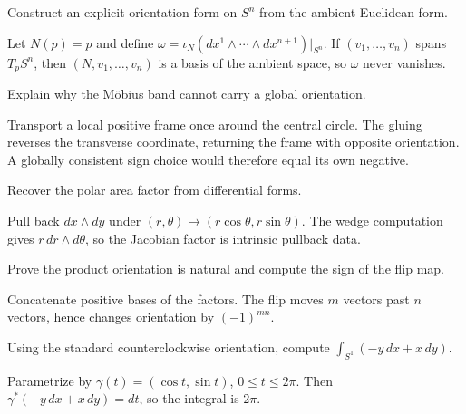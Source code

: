 \begin{problem}\label{prob:vii10-06}
Construct an explicit orientation form on $S^n$ from the ambient Euclidean form.
\end{problem}
\begin{solution}
Let $N(p)=p$ and define $\omega=\iota_N(dx^1\wedge\cdots\wedge dx^{n+1})|_{S^n}$. If $(v_1,\ldots,v_n)$ spans $T_pS^n$, then $(N,v_1,\ldots,v_n)$ is a basis of the ambient space, so $\omega$ never vanishes.
\end{solution}

\begin{problem}\label{prob:vii10-07}
Explain why the M\"obius band cannot carry a global orientation.
\end{problem}
\begin{solution}
Transport a local positive frame once around the central circle. The gluing reverses the transverse coordinate, returning the frame with opposite orientation. A globally consistent sign choice would therefore equal its own negative.
\end{solution}

\begin{problem}\label{prob:vii10-08}
Recover the polar area factor from differential forms.
\end{problem}
\begin{solution}
Pull back $dx\wedge dy$ under $(r,\theta)\mapsto(r\cos\theta,r\sin\theta)$. The wedge computation gives $r\,dr\wedge d\theta$, so the Jacobian factor is intrinsic pullback data.
\end{solution}

\begin{problem}\label{prob:vii10-09}
Prove the product orientation is natural and compute the sign of the flip map.
\end{problem}
\begin{solution}
Concatenate positive bases of the factors. The flip moves $m$ vectors past $n$ vectors, hence changes orientation by $(-1)^{mn}$.
\end{solution}

\begin{problem}\label{prob:vii10-10}
Using the standard counterclockwise orientation, compute $\int_{S^1}(-y\,dx+x\,dy)$.
\end{problem}
\begin{solution}
Parametrize by $\gamma(t)=(\cos t,\sin t)$, $0\le t\le2\pi$. Then $\gamma^*(-y\,dx+x\,dy)=dt$, so the integral is $2\pi$.
\end{solution}


